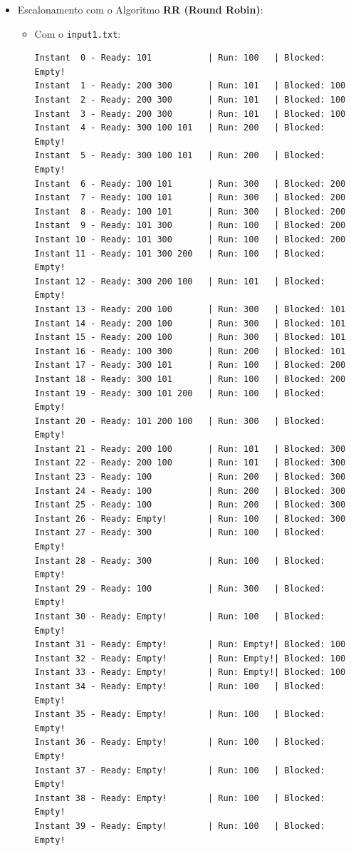 \documentclass[11pt]{article}   %
\begin{document}
\begin{itemize}
\begin{itemize}
\begin{verbatim}
        \end{verbatim}
    \end{itemize}
    \item Escalonamento com o Algoritmo \textbf{RR (Round Robin)}:
    \begin{itemize}
        \item Com o \verb|input1.txt|:
        \begin{verbatim}
Instant  0 - Ready: 101           | Run: 100   | Blocked: Empty!
Instant  1 - Ready: 200 300       | Run: 101   | Blocked: 100 
Instant  2 - Ready: 200 300       | Run: 101   | Blocked: 100 
Instant  3 - Ready: 200 300       | Run: 101   | Blocked: 100 
Instant  4 - Ready: 300 100 101   | Run: 200   | Blocked: Empty!
Instant  5 - Ready: 300 100 101   | Run: 200   | Blocked: Empty!
Instant  6 - Ready: 100 101       | Run: 300   | Blocked: 200 
Instant  7 - Ready: 100 101       | Run: 300   | Blocked: 200 
Instant  8 - Ready: 100 101       | Run: 300   | Blocked: 200 
Instant  9 - Ready: 101 300       | Run: 100   | Blocked: 200 
Instant 10 - Ready: 101 300       | Run: 100   | Blocked: 200 
Instant 11 - Ready: 101 300 200   | Run: 100   | Blocked: Empty!
Instant 12 - Ready: 300 200 100   | Run: 101   | Blocked: Empty!
Instant 13 - Ready: 200 100       | Run: 300   | Blocked: 101 
Instant 14 - Ready: 200 100       | Run: 300   | Blocked: 101 
Instant 15 - Ready: 200 100       | Run: 300   | Blocked: 101 
Instant 16 - Ready: 100 300       | Run: 200   | Blocked: 101 
Instant 17 - Ready: 300 101       | Run: 100   | Blocked: 200 
Instant 18 - Ready: 300 101       | Run: 100   | Blocked: 200 
Instant 19 - Ready: 300 101 200   | Run: 100   | Blocked: Empty!
Instant 20 - Ready: 101 200 100   | Run: 300   | Blocked: Empty!
Instant 21 - Ready: 200 100       | Run: 101   | Blocked: 300 
Instant 22 - Ready: 200 100       | Run: 101   | Blocked: 300 
Instant 23 - Ready: 100           | Run: 200   | Blocked: 300 
Instant 24 - Ready: 100           | Run: 200   | Blocked: 300 
Instant 25 - Ready: 100           | Run: 200   | Blocked: 300 
Instant 26 - Ready: Empty!        | Run: 100   | Blocked: 300 
Instant 27 - Ready: 300           | Run: 100   | Blocked: Empty!
Instant 28 - Ready: 300           | Run: 100   | Blocked: Empty!
Instant 29 - Ready: 100           | Run: 300   | Blocked: Empty!
Instant 30 - Ready: Empty!        | Run: 100   | Blocked: Empty!
Instant 31 - Ready: Empty!        | Run: Empty!| Blocked: 100 
Instant 32 - Ready: Empty!        | Run: Empty!| Blocked: 100 
Instant 33 - Ready: Empty!        | Run: Empty!| Blocked: 100 
Instant 34 - Ready: Empty!        | Run: 100   | Blocked: Empty!
Instant 35 - Ready: Empty!        | Run: 100   | Blocked: Empty!
Instant 36 - Ready: Empty!        | Run: 100   | Blocked: Empty!
Instant 37 - Ready: Empty!        | Run: 100   | Blocked: Empty!
Instant 38 - Ready: Empty!        | Run: 100   | Blocked: Empty!
Instant 39 - Ready: Empty!        | Run: 100   | Blocked: Empty!           
        \end{verbatim}
    \end{itemize}
\end{itemize}
\end{document}

